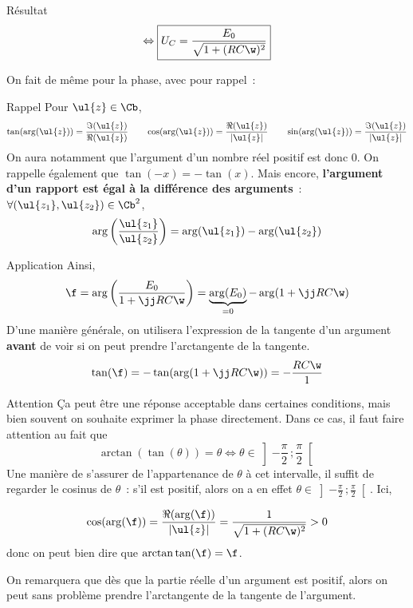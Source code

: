 \documentclass[../main/main.tex]{subfiles}
\begin{document}
\begin{rprop}{Résultat}
    \begin{gather*}
        \Leftrightarrow
        \boxed{
        U_C = \frac{E_0}{\sqrt{1+(RC\w)^2}}}
    \end{gather*}
\end{rprop}

On fait de même pour la phase, avec pour rappel~:
\begin{rrapp}{Rappel}
    Pour $\ul{z} \in \Cb$,
    \[\tan(\arg(\ul{z})) = \frac{\Im(\ul{z})}{\Re(\ul{z})}
    \qquad
    \cos(\arg(\ul{z})) = \frac{\Re(\ul{z})}{|\ul{z}|}
    \qquad
    \sin(\arg(\ul{z})) = \frac{\Im(\ul{z})}{|\ul{z}|}\]
    On aura notamment que l'argument d'un nombre réel positif est donc 0. On
    rappelle également que $\tan(-x) = -\tan(x)$. \bigbreak
    Mais encore, 
    \textbf{l'argument d'un rapport est égal à la différence des arguments}~:
    $\forall (\ul{z_1}, \ul{z_2}) \in \Cb^2$,
    \[ \arg\left( \frac{\ul{z_1}}{\ul{z_2}} \right) =
    \arg(\ul{z_1}) - \arg(\ul{z_2})\]
    \vspace*{-30pt}
\end{rrapp}
\begin{rexem}{Application}
    Ainsi,
    \begin{gather*}
        \f
            = \arg \left( \frac{E_0}{1+\jj RC\w} \right)
            = \underbrace{\arg(E_0)}_{=0} - \arg (1+\jj RC\w)
    \end{gather*}
    D'une manière générale, on utilisera l'expression de la tangente d'un
    argument \textbf{avant} de voir si on peut prendre l'arctangente de la
    tangente. 
    \begin{gather*}
        \tan(\f)
            = - \tan(\arg(1+\jj RC\w))
            = - \frac{RC\w}{1}
    \end{gather*}
\end{rexem}
\begin{rror}{Attention}
    Ça peut être une réponse acceptable dans certaines conditions, mais bien souvent
    on souhaite exprimer la phase directement. Dans ce cas, il faut faire attention
    au fait que
    \[\arctan(\tan(\theta)) = \theta \Leftrightarrow \theta \in \left] -
    \frac{\pi}{2}\,; \frac{\pi}{2} \right[\]
    Une manière de s'assurer de l'appartenance de $\theta$ à cet intervalle, il
    suffit de regarder le cosinus de
    $\theta$~: s'il est positif, alors on a en effet $\theta \in \left] -
    \frac{\pi}{2}\,; \frac{\pi}{2} \right[$. Ici,

    \begin{gather*}
        \cos(\arg(\f))
            = \frac{\Re(\arg(\f))}{|\ul{z}|}
            = \frac{1}{\sqrt{1 + (RC\w)^2}} > 0
    \end{gather*}
    donc on peut bien dire que $\arctan\tan(\f) = \f$.
\end{rror}
On remarquera que dès que la partie réelle d'un argument est positif, alors on
peut sans problème prendre l'arctangente de la tangente de l'argument.
\end{document}
